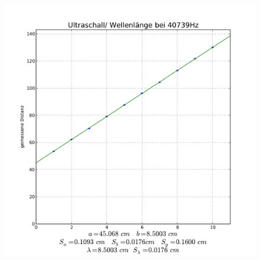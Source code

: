 \documentclass[12pt,a4paper]{article}
\begin{document}
\begin{figure}[hbt]
	\centering
	\includegraphics[width=15cm]{40739Hz}
	\label{Bild1}
\end{figure}
\end{document}
